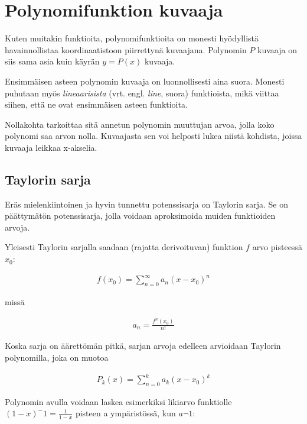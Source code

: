 \chapter{Polynomifunktion kuvaaja}
Kuten muitakin funktioita, polynomifunktioita on monesti hyödyllistä
havainnollistaa koordinaatistoon piirrettynä kuvaajana. Polynomin
$P$ kuvaaja on siis sama asia kuin käyrän $y = P(x)$ kuvaaja.

\begin{kuvaajapohja}{1.5}{-2}{2}{-3}{3}
\end{kuvaajapohja}

Ensimmäisen asteen polynomin kuvaaja on luonnollisesti aina suora. Monesti
puhutaan myös \emph{lineaarisista} (vrt. engl. \emph{line}, suora)
funktioista, mikä viittaa siihen, että ne ovat ensimmäisen asteen funktioita.

Nollakohta tarkoittaa sitä annetun polynomin muuttujan arvoa, jolla koko
polynomi saa arvon nolla. Kuvaajasta sen voi helposti lukea niistä kohdista,
joissa kuvaaja leikkaa x-akselia.

\section{Taylorin sarja}
Eräs mielenkiintoinen ja hyvin tunnettu potenssisarja on Taylorin sarja.
Se on päättymätön potenssisarja, jolla voidaan aproksimoida muiden funktioiden arvoja.

Yleisesti Taylorin sarjalla saadaan (rajatta derivoituvan) funktion $f$ arvo pisteessä $x_0$:

\begin{align*}
	f(x_0) = \sum\limits_{n=0}^\infty a_n(x-x_0)^n
\end{align*}

missä

\begin{align*}
a_n = \frac{f^n(x_0)}{n!}
\end{align*}

Koska sarja on äärettömän pitkä, sarjan arvoja edelleen arvioidaan Taylorin polynomilla, joka on muotoa

\begin{align*}
	P_k(x) = \sum\limits_{n=0}^k a_k(x-x_0)^k
\end{align*}

Polynomin avulla voidaan laskea esimerkiksi likiarvo funktiolle
$(1-x)^-1 = \frac{1}{1-x}$ pisteen a ympäristössä, kun $a \neg 1$:

